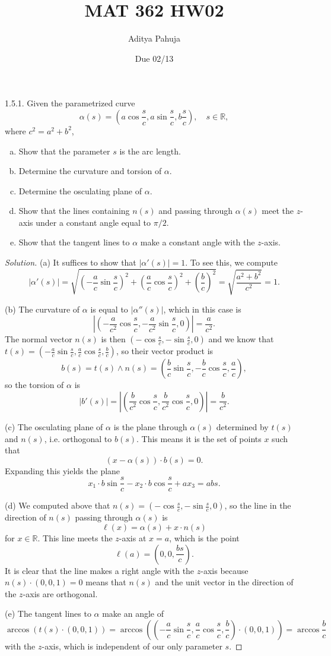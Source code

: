 \documentclass[11pt]{scrartcl}
\title{\vspace{-2em}MAT 362 HW02}
\author{\large Aditya Pahuja}
\date{\large Due 02/13}
\providecommand{\RR}{\mathbb R}
\providecommand{\ii}{\item}
\newenvironment{soln}{\begin{proof}[Solution]}{\end{proof}}
\providecommand{\abs}[1]{\left|#1\right|}
\begin{document}
\maketitle

\begin{problem*}1.5.1.
	Given the parametrized curve
	\[\alpha(s) = \left(a\cos\frac sc, a\sin\frac sc, b\frac sc\right),\quad
	s\in\RR,\]
	where $c^2 = a^2 + b^2$,
	\begin{enumerate}[(a)]
		\ii Show that the parameter $s$ is the arc length.
		\ii Determine the curvature and torsion of $\alpha$.
		\ii Determine the osculating plane of $\alpha$.
		\ii Show that the lines containing $n(s)$ and
		passing through $\alpha(s)$ meet the $z$-axis under a constant angle
		equal to $\pi/2$.
		\ii Show that the tangent lines to $\alpha$ make
		a constant angle with the $z$-axis.
	\end{enumerate}
\end{problem*}

\begin{soln}
	(a) It suffices to show that $|\alpha'(s)| = 1$. To see this, we compute
	\[|\alpha'(s)| = \sqrt{\left(-\frac ac\sin\frac sc\right)^2 +
	\left(\frac ac\cos\frac sc\right)^2 + \left(\frac bc\right)^2}
	= \sqrt{\frac{a^2 + b^2}{c^2}} = 1.\]
	
	(b) The curvature of $\alpha$ is equal to $|\alpha''(s)|$,
	which in this case is
	\[\abs{\left(-\frac{a}{c^2}\cos\frac sc, -\frac{a}{c^2}\sin\frac sc,
		0\right)} = \boxed{\frac{a}{c^2}}.\]
	The normal vector $n(s)$ is then $(-\cos\frac sc,-\sin\frac sc,0)$
	and we know that $t(s) = (-\frac ac\sin\frac sc, \frac ac\cos\frac sc,
	\frac bc)$, so their vector product is
	\[b(s)= t(s)\wedge n(s) = \left(\frac bc\sin\frac sc, -\frac bc\cos\frac sc,
	\frac ac\right),\]
	so the torsion of $\alpha$ is
	\[|b'(s)| = \abs{\left(\frac b{c^2}\cos\frac sc,
		\frac b{c^2}\cos\frac sc,0\right)}
	= \boxed{\frac b{c^2}}.\]
	
	(c) The osculating plane of $\alpha$ is the plane through $\alpha(s)$
	determined by $t(s)$ and $n(s)$, i.e. orthogonal to $b(s)$.
	This means it is the set of points $x$ such that
	\[(x - \alpha(s))\cdot b(s) = 0.\]
	Expanding this yields the plane
	\[\boxed{x_1\cdot b\sin\frac sc - x_2\cdot b\cos\frac sc + ax_3 = abs}.\]
	
	(d) We computed above that $n(s) = (-\cos\frac sc, -\sin\frac sc, 0)$,
	so the line in the direction of $n(s)$ passing through $\alpha(s)$ is
	\[\ell(x) = \alpha(s) + x\cdot n(s)\]
	for $x\in\RR$. This line meets the $z$-axis at $x = a$, which is the point
	\[\ell(a) = \left(0, 0, \frac{bs}c\right).\]
	It is clear that the line makes a right angle with the $z$-axis
	because $n(s)\cdot (0,0,1) = 0$ means that $n(s)$
	and the unit vector in the direction of the $z$-axis are orthogonal.
	
	(e) The tangent lines to $\alpha$ make an angle of
	\[\arccos(t(s)\cdot (0,0,1)) =
	\arccos\left(
	\left(-\frac ac\sin\frac sc, \frac ac\cos\frac sc, \frac bc\right)
	\cdot(0,0,1)\right) = \arccos\frac bc\]
	with the $z$-axis, which is independent of our only parameter $s$.
\end{soln}
\end{document}

